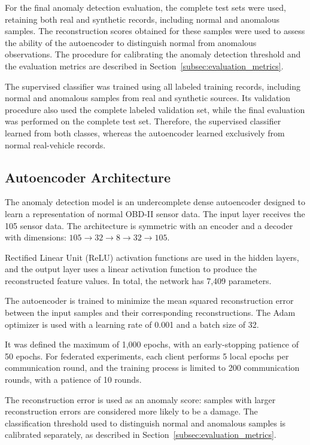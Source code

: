 \documentclass[12pt]{article}
\begin{document}
For the final anomaly detection evaluation, the complete test sets were used, retaining both real and synthetic records, including normal and anomalous samples. The reconstruction scores obtained for these samples were used to assess the ability of the autoencoder to distinguish normal from anomalous observations. The procedure for calibrating the anomaly detection threshold and the evaluation metrics are described in Section~\ref{subsec:evaluation_metrics}.

The supervised classifier was trained using all labeled training records, including normal and anomalous samples from real and synthetic sources. Its validation procedure also used the complete labeled validation set, while the final evaluation was performed on the complete test set. Therefore, the supervised classifier learned from both classes, whereas the autoencoder learned exclusively from normal real-vehicle records.

\subsection{Autoencoder Architecture}
\label{subsec:AutoencoderArchitecture}

The anomaly detection model is an undercomplete dense autoencoder designed to learn a representation of normal OBD-II sensor data. The input layer receives the 105 sensor data. The architecture is symmetric with an encoder and a decoder with dimensions: \(105 \rightarrow 32 \rightarrow 8 \rightarrow 32 \rightarrow 105\). 

Rectified Linear Unit (ReLU) activation functions are used in the hidden layers, and the output layer uses a linear activation function to produce the reconstructed feature values. In total, the network has 7,409 parameters.

The autoencoder is trained to minimize the mean squared reconstruction error between the input samples and their corresponding reconstructions. The Adam optimizer is used with a learning rate of 0.001 and a batch size of 32.

It was defined the maximum of 1,000 epochs, with an early-stopping patience of 50 epochs. For federated experiments, each client performs 5 local epochs per communication round, and the training process is limited to 200 communication rounds, with a patience of 10 rounds.


The reconstruction error is used as an anomaly score: samples with larger reconstruction errors are considered more likely to be a damage. The classification threshold used to distinguish normal and anomalous samples is calibrated separately, as described in Section~\ref{subsec:evaluation_metrics}.
\end{document}
